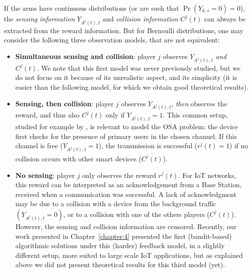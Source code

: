 If the arms have continuous distributions (or are such that  $\Pr(Y_{k,s}=0)=0$), the \emph{sensing information} $Y_{A^j(t),t}$ and \emph{collision information} $C^j(t)$ can always be extracted from the reward information.
But for Bernoulli distributions, one may consider the following three observation models, that are not equivalent:

\begin{itemize}
  \item[\modelun]
    \textbf{Simultaneous sensing and collision}: player $j$ observes  $Y_{A^j(t),t}$ \emph{and} $C^j(t)$.
    We note that this first model was never previously studied, but we do not focus on it because of its unrealistic aspect, and its simplicity (it is easier than the following model, for which we obtain good theoretical results).
  \item[\modeldeux]
    \textbf{Sensing, then collision}: player $j$ observes $Y_{A^j(t),t}$, \emph{then} observes the reward, and thus also $C^j(t)$ only if $Y_{A^j(t),t} = 1$.
    This common setup, studied for example by \cite{Anandkumar11,Avner15,Rosenski16}, is relevant to model the OSA problem: the device first checks for the presence of primary users in the chosen channel.
    If this channel is free ($Y_{A^j(t),t}=1$), the transmission is successful ($r^j(t)=1$) if no collision occurs with other smart devices ($\overline{C^j(t)}$).
  \item[\modeltrois]
    \textbf{No sensing}: player $j$ only observes the reward $r^j(t)$.
    For IoT networks, this reward can be interpreted as an acknowledgement from a Base Station,
    received when a communication was successful.
    A lack of acknowledgment may be due to a collision
    with a device from the background traffic $(Y_{A^j(t),t}=0)$,
    or to a collision with one of the others players ($C^j(t)$).
    However, the sensing and collision information are censored.
    Recently, our work presented in Chapter~\ref{chapter:4} \cite{Bonnefoi17} presented the first (bandit-based) algorithmic solutions under this (harder) feedback model, in a slightly different setup, more suited to large scale IoT applications, but as explained above we did not present theoretical results for this third model (yet).
\end{itemize}

